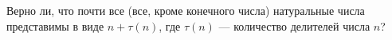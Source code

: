 \documentclass{article}
\begin{document}
Верно ли, что почти все (все, кроме конечного числа) натуральные числа представимы в виде $n + \tau(n)$, где $\tau(n)$ --- количество делителей числа $n$?
\end{document}
